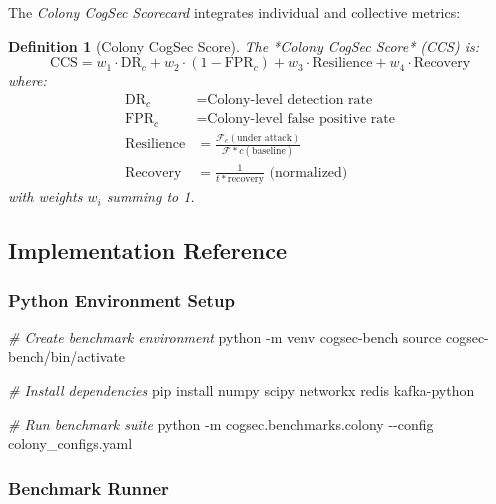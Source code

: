 \documentclass[
]{article}
\newenvironment{Shaded}{}{}
\newcommand{\AttributeTok}[1]{\textcolor[rgb]{0.49,0.56,0.16}{#1}}
\newcommand{\BuiltInTok}[1]{\textcolor[rgb]{0.00,0.50,0.00}{#1}}
\newcommand{\CommentTok}[1]{\textcolor[rgb]{0.38,0.63,0.69}{\textit{#1}}}
\newcommand{\ExtensionTok}[1]{#1}
\newcommand{\NormalTok}[1]{#1}
\newtheorem{definition}{Definition}[section]
\begin{document}
The \emph{Colony CogSec Scorecard} integrates individual and collective
metrics:

\begin{definition}[Colony CogSec Score]
\label{def:cogsec-score-impl}
The *Colony CogSec Score* (CCS) is:
\begin{equation}
\label{eq:ccs-impl}
\text{CCS} = w_1 \cdot \text{DR}_c + w_2 \cdot (1 - \text{FPR}_c) + w_3 \cdot \text{Resilience} + w_4 \cdot \text{Recovery}
\end{equation}
where:
\begin{align}
\text{DR}_c &= \text{Colony-level detection rate} \\
\text{FPR}_c &= \text{Colony-level false positive rate} \\
\text{Resilience} &= \frac{\mathcal{F}_c(\text{under attack})}{\mathcal{F}*c(\text{baseline})} \\
\text{Recovery} &= \frac{1}{t*{\text{recovery}}} \text{ (normalized)}
\end{align}
with weights $w_i$ summing to 1.
\end{definition}

\subsection{Implementation Reference}\label{implementation-reference}

\subsubsection{Python Environment Setup}\label{python-environment-setup}

\begin{Shaded}
\begin{Highlighting}[]
\CommentTok{\# Create benchmark environment}
\ExtensionTok{python} \AttributeTok{{-}m}\NormalTok{ venv cogsec{-}bench}
\BuiltInTok{source}\NormalTok{ cogsec{-}bench/bin/activate}

\CommentTok{\# Install dependencies}
\ExtensionTok{pip}\NormalTok{ install numpy scipy networkx redis kafka{-}python}

\CommentTok{\# Run benchmark suite}
\ExtensionTok{python} \AttributeTok{{-}m}\NormalTok{ cogsec.benchmarks.colony }\AttributeTok{{-}{-}config}\NormalTok{ colony\_configs.yaml}
\end{Highlighting}
\end{Shaded}

\subsubsection{Benchmark Runner}\label{benchmark-runner}
\end{document}
